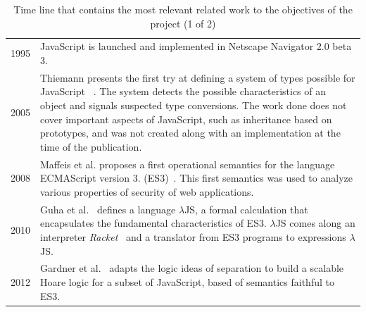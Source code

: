 \documentclass[runningheads]{llncs}
\begin{document}
\begin{table}[h!]
\vspace{-2em}
\renewcommand{\arraystretch}{1.8}

\begin{tabular}{@{\,}r <{\hskip 2pt} !{\makebox[0pt]{\textbullet}\hskip-0.5pt\vrule width 1pt\hspace{\labelsep}} >{\raggedright\arraybackslash}p{316pt}}
  1995 & JavaScript is launched and implemented in Netscape Navigator 2.0 beta 3.\\
  2005 & Thiemann presents the first try at defining a system of types possible for JavaScript ~\cite{Thiemann-2005}. The system detects the possible characteristics of an object and signals suspected type conversions. The work done does not cover important aspects of JavaScript, such as inheritance based on prototypes, and was not created along with an implementation at the time of the publication.\\
  2008 & Maffeis et al. proposes a first operational semantics for the language ECMAScript version 3. (ES3)~\cite{operational_semantics_javascript-2008}. This first semantics was used to analyze various properties of security of web applications.\\
  2010 & Guha et al.~\cite{essence_javascript-2010} defines a language $\lambda$JS, a formal calculation that encapsulates the fundamental characteristics of ES3. $\lambda$JS comes along an interpreter \emph{Racket}~\cite{Racket} and a translator from ES3 programs to expressions $\lambda$JS.\\
  2012 & Gardner et al.~\cite{Gardner-2012} adapts the logic ideas of separation to build a scalable Hoare logic for a subset of JavaScript, based of semantics faithful to ES3.\\
\end{tabular}
\vspace{1em}
\caption{Time line that contains the most relevant related work to the objectives of the project (1 of 2)}
\label{tab:related-work_timeline-1}
\end{table}
\vspace{-2em}
\end{document}
